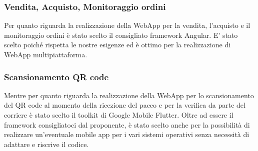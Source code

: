 \documentclass[a4paper, 12pt]{article}
\begin{document}
\subsubsection*{Vendita, Acquisto, Monitoraggio ordini}
Per quanto riguarda la realizzazione della WebApp per la vendita, l'acquisto e il monitoraggio ordini è stato scelto il consigliato framework Angular. E' stato scelto poiché rispetta le nostre esigenze ed è ottimo per la realizzazione di WebApp multipiattaforma. 
\subsubsection*{Scansionamento QR code}
Mentre per quanto riguarda la realizzazione della WebApp per lo scansionamento del QR code al momento della ricezione del pacco e per la verifica da parte del corriere è stato scelto il toolkit di Google Mobile Flutter. Oltre ad essere il framework consigliatoci dal proponente, è stato scelto anche per la possibilità di realizzare un'eventuale mobile app per i vari sistemi operativi senza necessità di adattare e riscrive il codice.
\end{document}
